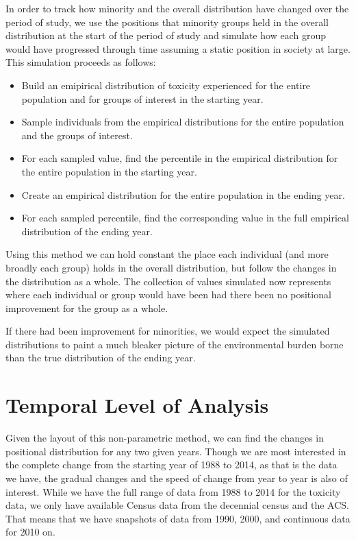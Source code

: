\documentclass[12pt,twoside]{dukestatscithesis}
\theoremstyle{definition}
\theoremstyle{definition}
\theoremstyle{definition}
\theoremstyle{remark}
\begin{document}
In order to track how minority and the overall distribution have changed
over the period of study, we use the positions that minority groups held
in the overall distribution at the start of the period of study and
simulate how each group would have progressed through time assuming a
static position in society at large. This simulation proceeds as
follows:
\begin{itemize}
\item
  Build an emipirical distribution of toxicity experienced for the
  entire population and for groups of interest in the starting year.
\item
  Sample individuals from the empirical distributions for the entire
  population and the groups of interest.
\item
  For each sampled value, find the percentile in the empirical
  distribution for the entire population in the starting year.
\item
  Create an empirical distribution for the entire population in the
  ending year.
\item
  For each sampled percentile, find the corresponding value in the full
  empirical distribution of the ending year.
\end{itemize}
Using this method we can hold constant the place each individual (and
more broadly each group) holds in the overall distribution, but follow
the changes in the distribution as a whole. The collection of values
simulated now represents where each individual or group would have been
had there been no positional improvement for the group as a whole.

If there had been improvement for minorities, we would expect the
simulated distributions to paint a much bleaker picture of the
environmental burden borne than the true distribution of the ending
year.

\section{Temporal Level of Analysis}\label{temporal-level-of-analysis}

Given the layout of this non-parametric method, we can find the changes
in positional distribution for any two given years. Though we are most
interested in the complete change from the starting year of 1988 to
2014, as that is the data we have, the gradual changes and the speed of
change from year to year is also of interest. While we have the full
range of data from 1988 to 2014 for the toxicity data, we only have
available Census data from the decennial census and the ACS. That means
that we have snapshots of data from 1990, 2000, and continuous data for
2010 on.
\end{document}
